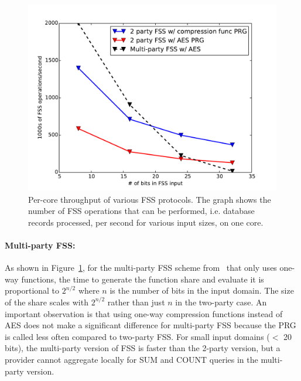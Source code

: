 \begin{figure}
	\centering
	\includegraphics[width=\textwidth]{splinter-figs/micro.pdf}
	\caption[Per-core throughput of various FSS protocols.]{Per-core throughput of various FSS protocols. 
		The graph shows the number of FSS operations that can be performed, i.e. database records processed, per second for various input sizes, on one core.}
	\label{fig:micro2}
\end{figure}


\paragraph{Multi-party FSS:}
As shown in Figure~\ref{fig:micro2}, for the multi-party FSS 
scheme from~\cite{fss} that only uses one-way functions, 
the time to generate the function share and evaluate it is proportional
to $2^{n/2}$ where $n$ is the number of bits in the input domain. 
The size of the share scales with $2^{n/2}$
rather than just $n$ in the two-party case. 
An important observation
is that using one-way compression 
functions instead of AES does not make a significant difference for multi-party 
FSS because the PRG is called
less often compared to two-party FSS. 
For small input domains ($<$ 20 bits),
the multi-party version of FSS is faster than the 2-party version, but 
a provider cannot aggregate locally for SUM and COUNT queries in the multi-party version.


